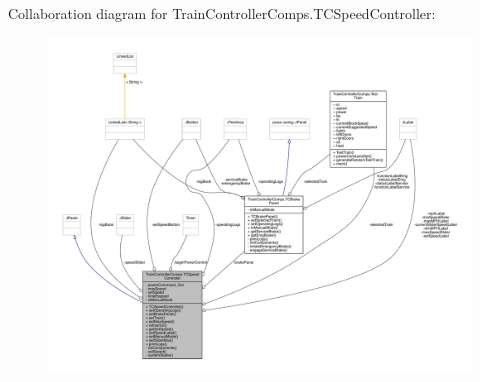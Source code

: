 Collaboration diagram for Train\+Controller\+Comps.\+T\+C\+Speed\+Controller\+:
\nopagebreak
\begin{figure}[H]
\begin{center}
\leavevmode
\includegraphics[width=350pt]{classTrainControllerComps_1_1TCSpeedController__coll__graph}
\end{center}
\end{figure}
